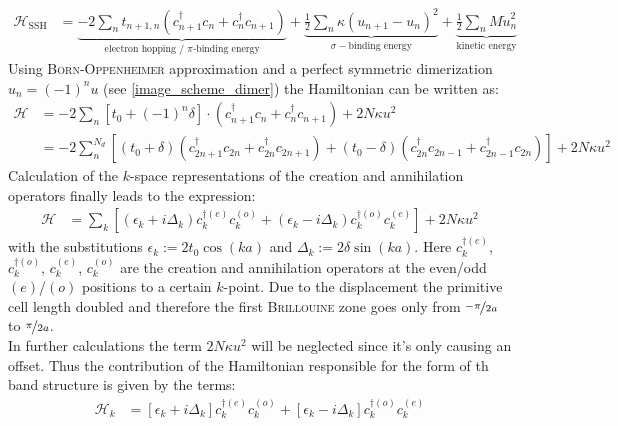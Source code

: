 \begin{align}
	\mathcal{H}_\text{SSH} &= \underbrace{-2\sum_{n} t_{n+1,n}\left(c_{n+1}^\dagger c_n + c_n^\dagger c_{n+1}\right)}_{\text{electron hopping / $\pi$-binding energy}} +
	\underbrace{\frac{1}{2}\sum_n \kappa (u_{n+1} - u_n)^2}_{\sigma-\text{binding energy}} + 
	\underbrace{\frac{1}{2} \sum_n M \dot{u}^2_n}_{\text{kinetic energy}}
\end{align}
Using \textsc{Born-Oppenheimer} approximation and a perfect symmetric dimerization $u_n = (-1)^nu$ (see \cref{image_scheme_dimer}) the Hamiltonian can be written as:
\begin{align}
	\mathcal{H} &= -2\sum_n \left[t_0 + (-1)^n\delta\right]\cdot\left(c_{n+1}^\dagger c_n + c_n^\dagger c_{n+1}\right) + 2N\kappa u^2\\
	&= -2\sum_n^{N_d} \left[\left(t_0+\delta\right)\left(c_{2n+1}^\dagger c_{2n} + c_{2n}^\dagger c_{2n+1} \right) + 
	\left(t_0-\delta\right)\left(c_{2n}^\dagger c_{2n-1} + c_{2n-1}^\dagger c_{2n} \right)\right]+2N\kappa u^2
\end{align}
Calculation of the $k$-space representations of the creation and annihilation operators finally leads to the expression:
\begin{align}
\mathcal{H} &= \sum_k \left[
\left(\epsilon_k + i\Delta_k\right)c_{k}^{\dagger(e)}c_{k}^{(o)} + \left(\epsilon_k-i\Delta_k \right)	c_{k}^{\dagger(o)}c_{k}^{(e)}\right] + 2N\kappa u^2
\end{align}
with the substitutions $\epsilon_k := 2t_0\cos(ka)$ and $\Delta_k := 2\delta\sin(ka)$. Here $c^{\dagger(e)}_k$, $c^{\dagger(o)}_k$, $c^{(e)}_k$, $c^{(o)}_k$ are the creation and annihilation operators at the even/odd $(e)$/$(o)$ positions to a certain $k$-point. Due to the displacement the primitive cell length doubled and therefore the first \textsc{Brillouine} zone goes only from $\nicefrac{-\pi}{2a}$ to $\nicefrac{\pi}{2a}$.\\
In further calculations the term $2N\kappa u^2$ will be neglected since it's only causing an offset. Thus the contribution of the Hamiltonian responsible for the form of th band structure is given by the terms:
\begin{align}
	\mathcal{H}_k &=
	\left[\epsilon_k + i\Delta_k\right]c_{k}^{\dagger(e)}c_{k}^{(o)} + \left[\epsilon_k-i\Delta_k \right]	c_{k}^{\dagger(o)}c_{k}^{(e)}
\end{align}
